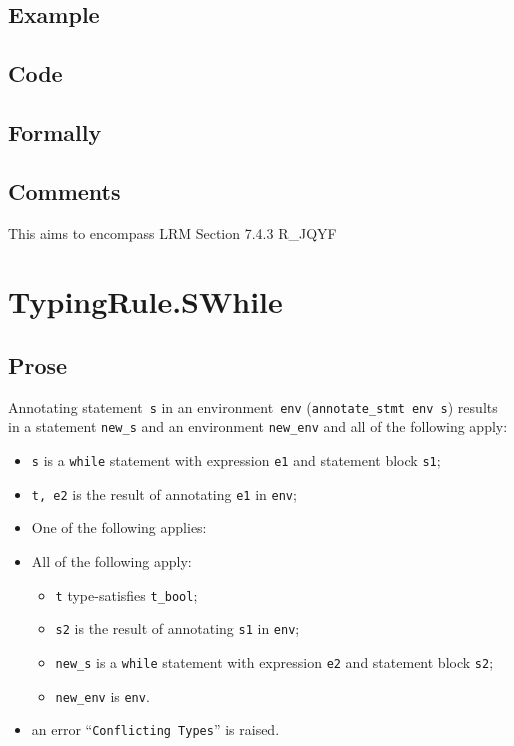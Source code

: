 \documentclass{book}
\begin{document}
  \subsection{Example}

  \subsection{Code}

\begin{emptyformal}
    \subsection{Formally}
\end{emptyformal}

\subsection{Comments}
    This aims to encompass LRM Section 7.4.3 R\_JQYF

    
\section{TypingRule.SWhile \label{sec:TypingRule.SWhile}}

  \subsection{Prose}
Annotating statement~\texttt{s} in an environment~\texttt{env}
(\texttt{annotate\_stmt env s}) results in a statement \texttt{new\_s} and an
environment \texttt{new\_env} and all of the following apply:
   \begin{itemize}
   \item \texttt{s} is a \texttt{while} statement with expression \texttt{e1} and statement block \texttt{s1};
   \item \texttt{t, e2} is the result of annotating \texttt{e1} in \texttt{env};
   \item One of the following applies:
     \item All of the following apply:
       \begin{itemize}
       \item \texttt{t} type-satisfies \texttt{t\_bool}; 
       \item \texttt{s2} is the result of annotating \texttt{s1} in \texttt{env};
       \item \texttt{new\_s} is a \texttt{while} statement with expression \texttt{e2} and statement block \texttt{s2};
       \item \texttt{new\_env} is \texttt{env}.
       \end{itemize}
     \item an error ``\texttt{Conflicting Types}'' is raised.
   \end{itemize}
\end{document}
